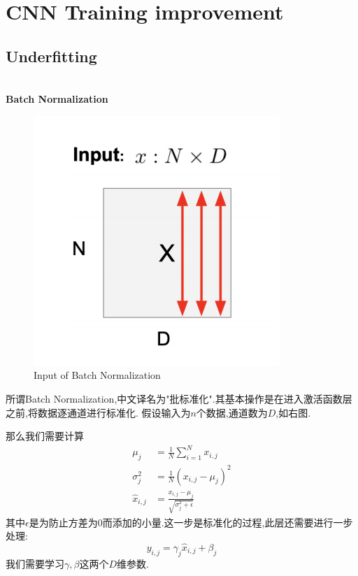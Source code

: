 \section{CNN Training improvement}

\subsection{Underfitting}

\textbf{\\Batch Normalization}

\begin{figure}%
	\includegraphics[scale=0.65]{figures/BNsize.png}
	\caption{Input of Batch Normalization}
	\label{Input of Batch Normalization}
\end{figure}

所谓Batch Normalization,中文译名为"批标准化".其基本操作是在进入激活函数层之前,将数据逐通道进行标准化.
假设输入为$n$个数据,通道数为$D$,如右图.

那么我们需要计算
\begin{equation}
	\begin{split}
		\mu_j &= \frac{1}{N} \sum_{i=1}^{N} x_{i, j}
		\\
		\sigma_j^2 &= \frac{1}{N} (x_{i, j} - \mu_j)^2
		\\
		\hat{x}_{i, j} &= \frac{x_{i, j} - \mu_j}{\sqrt{\sigma_j^2 + \epsilon}}
	\end{split}
	\label{BN calculation}
\end{equation}
其中$\epsilon$是为防止方差为$0$而添加的小量.这一步是标准化的过程,此层还需要进行一步处理:
\begin{equation}
	y_{i, j} = \gamma_{j} \hat{x}_{i,j} + \beta_j
\end{equation}
我们需要学习$\gamma, \beta$这两个$D$维参数.


